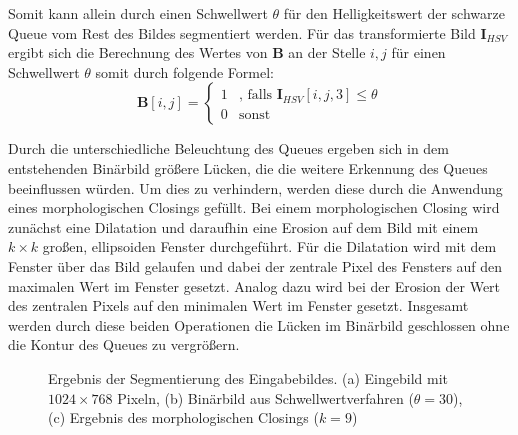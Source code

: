 Somit kann allein durch einen Schwellwert $\theta$ für den Helligkeitswert der schwarze Queue vom Rest des Bildes segmentiert werden.
Für das transformierte Bild $\textbf{I}_{HSV}$ ergibt sich die Berechnung des Wertes von $\textbf{B}$ an der Stelle $i, j$ für einen Schwellwert $\theta$ somit durch folgende Formel:
\begin{equation*}
\textbf{B}[i,j] = \begin{cases}
1 &\text{, falls $\textbf{I}_{HSV}[i, j, 3] \leq \theta$}\\
0 &\text{sonst}
\end{cases}
\end{equation*}

Durch die unterschiedliche Beleuchtung des Queues ergeben sich in dem entstehenden Binärbild größere Lücken, die die weitere Erkennung des Queues beeinflussen würden.
Um dies zu verhindern, werden diese durch die Anwendung eines morphologischen Closings gefüllt.
Bei einem morphologischen Closing wird zunächst eine Dilatation und daraufhin eine Erosion auf dem Bild mit einem $k \times k$ großen, ellipsoiden Fenster durchgeführt. 
Für die Dilatation wird mit dem Fenster über das Bild gelaufen und dabei der zentrale Pixel des Fensters auf den maximalen Wert im Fenster gesetzt.
Analog dazu wird bei der Erosion der Wert des zentralen Pixels auf den minimalen Wert im Fenster gesetzt.
Insgesamt werden durch diese beiden Operationen die Lücken im Binärbild geschlossen ohne die Kontur des Queues zu vergrößern.

\begin{figure}[H]
	\label{fig:thresholded}
	\centering
	\caption{Ergebnis der Segmentierung des Eingabebildes. (a) Eingebild mit $1024 \times 768$ Pixeln, (b) Binärbild aus Schwellwertverfahren ($\theta = 30$),  (c) Ergebnis des morphologischen Closings ($k=9$)}
\end{figure}

